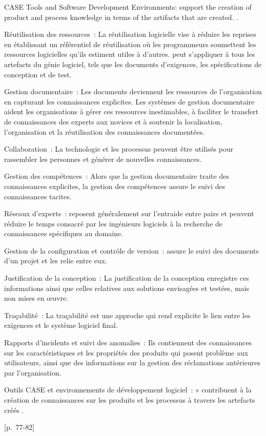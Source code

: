 {{\item CASE Tools and Software Development Environments: \elide support the creation of product and process knowledge in terms of the artifacts that are created. \elide.
}{
\item [] [pour tout type d'organisation]
\item Réutilisation des ressources~: \elide La réutilisation logicielle vise à réduire les reprises en établissant un référentiel de réutilisation où les programmeurs soumettent les ressources logicielles qu'ils estiment utiles à d'autres. \elide peut s'appliquer à tous les artefacts du génie logiciel, tels que les documents d'exigences, les spécifications de conception et de test. \elide
\item Gestion documentaire~: \elide Les documents deviennent les ressources de l'organisation en capturant les connaissances explicites. Les systèmes de gestion documentaire aident les organisations à gérer ces ressources inestimables, à faciliter le transfert de connaissances des experts aux novices et à soutenir la localisation, l'organisation et la réutilisation des connaissances documentées. \elide
\item Collaboration~: La technologie et les processus peuvent être utilisés pour rassembler les personnes et générer de nouvelles connaissances.
\item Gestion des compétences~: \elide Alors que la gestion documentaire traite des connaissances explicites, la gestion des compétences assure le suivi des connaissances tacites. \elide
\item Réseaux d'experts~: \elide reposent généralement sur l'entraide entre pairs et peuvent réduire le temps consacré par les ingénieurs logiciels à la recherche de connaissances spécifiques au domaine. \elide
\item [] [pour les organisations en développement logiciel]
\item Gestion de la configuration et contrôle de version~: \elide assure le suivi des documents d'un projet et les relie entre eux. \elide
\item Justification de la conception~: \elide La justification de la conception enregistre ces informations ainsi que celles relatives aux solutions envisagées et testées, mais non mises en œuvre. \elide
\item Traçabilité~: \elide La traçabilité est une approche qui rend explicite le lien entre les exigences et le système logiciel final. \elide
\item Rapports d'incidents et suivi des anomalies~: \elide Ils contiennent des connaissances sur les caractéristiques et les propriétés des produits qui posent problème aux utilisateurs, ainsi que des informations sur la gestion des réclamations antérieures par l'organisation. \elide
\item Outils CASE et environnements de développement logiciel~: » \elide contribuent à la création de connaissances sur les produits et les processus à travers les artefacts créés \elide.
}{[p.~77-82]}
    

}
